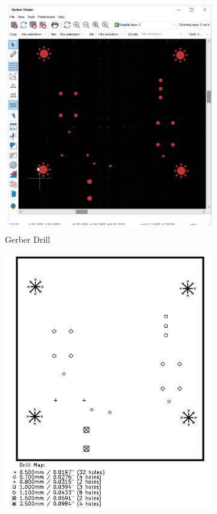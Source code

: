 \documentclass[12pt]{book}
\begin{document}
	\begin{figure}[!ht]
		\centering
		\begin{subfigure}[t]{0.35\textwidth}
			\includegraphics[width=\textwidth]{images/fab/fab_8}
			\caption{Gerber Drill}
		\end{subfigure}
		\begin{subfigure}[t]{0.35\textwidth}
			\includegraphics[width=\textwidth]{images/fab/fab_9}

\end{subfigure}
\end{figure}
\end{document}
